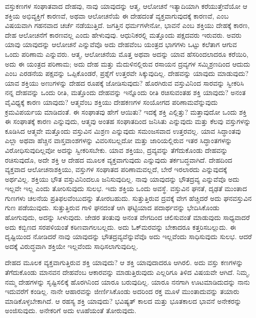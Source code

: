 \vskip 2pt

ವಸ್ತುಕಣಗಳ ಸಂಘಾತವಾದ ದೇಹವು, ನಾವು ಯಾವುದನ್ನು ಆತ್ಮ, ಆಲೋಚನೆ ಇತ್ಯಾದಿಯಾಗಿ ಕರೆಯುತ್ತೇವೆಯೋ ಆ ಶಕ್ತಿಯ ಅಭಿವ್ಯಕ್ತಿಗೆ ಕಾರಣವೆ, ಅಥವಾ ಆಲೋಚನೆಯೆ ಈ ದೇಹದಂತೆ ವ್ಯಕ್ತವಾಗುವುದಕ್ಕೆ ಕಾರಣವೆ, ಎಂಬ ವಿಷಯವಾಗಿ ಗಹನವಾದ ಚರ್ಚೆ ನಡೆಯುತ್ತಿದೆ. ಜಗತ್ತಿನ ಧರ್ಮಗಳೇನೋ, ಭಾವನೆ ಎಂಬ ಶಕ್ತಿಯು ದೇಹಕ್ಕೆ ಕಾರಣ, ದೇಹ ಆಲೋಚನೆಗೆ ಕಾರಣವಲ್ಲ ಎಂದು ಹೇಳುವುವು. ಆಧುನಿಕರಲ್ಲಿ ಮತ್ತೊಂದು ಪಕ್ಷದವರು ಇರುವರು. ಅವರು ಯಾವು ಯಾವುದನ್ನು ಆಲೋಚನೆ ಎನ್ನುವೆವೊ ಅದು ದೇಹವೆಂಬ ಯಂತ್ರದ ಭಾಗಗಳು ಒಟ್ಟು ಕಲೆತಾಗ ಆಗುವ ಒಂದು ಪರಿಣಾಮ ಎನ್ನುವರು. ಆತ್ಮ, ಆಲೋಚನೆಯ ಮೊತ್ತ ಅಥವಾ ಅದನ್ನು ಯಾವ ಹೆಸರಿಂದಲಾದರೂ ಕರೆಯಿರಿ, ಅದು ಈ ಯಂತ್ರದ ಪರಿಣಾಮ; ಅದು ದೇಹ ಮತ್ತು ಮೆದುಳಿನಲ್ಲಿರುವ ರಸಾಯನ ದ್ರವ್ಯಗಳ ಸಮ್ಮಿಶ್ರಣದಿಂದ ಆದುದು ಎಂಬ ಎರಡನೆಯ ಪಕ್ಷವನ್ನು ಒಪ್ಪಿಕೊಂಡರೆ, ಪ್ರಶ್ನೆಗೆ ಉತ್ತರವೇ ಸಿಕ್ಕುವುದಿಲ್ಲ. ದೇಹವನ್ನು ಯಾವುದು ಮಾಡುವುದು? ಯಾವ ಶಕ್ತಿಯು ಅಣುಗಳನ್ನು ದೇಹದ ರೂಪಕ್ಕೆ ಜೋಡಿಸುವುದು? ಹೊರಗಿರುವ ವಸ್ತುವಿನಿಂದ ಸಾರವನ್ನು ಸ್ವೀಕರಿಸಿ ನನ್ನ ದೇಹವನ್ನು ಒಂದು ರೀತಿ, ಮತ್ತೊಂದು ದೇಹವನ್ನು ಇನ್ನೊಂದು ರೀತಿ ರಚಿಸುವಂತಹ ಶಕ್ತಿ ಯಾವುದು? ಅನಂತ ವೈವಿಧ್ಯಕ್ಕೆ ಕಾರಣ ಯಾವುದು? ಆತ್ಮವೆಂಬ ಶಕ್ತಿಯು ದೇಹಕಣಗಳ ಸಂಯೋಗದ ಪರಿಣಾಮವೆನ್ನುವುದು ಕ್ರಮವಿಪರ್ಯಯ ಮಾಡಿದಂತೆ. ಈ ಸಂಘಾತವು ಹೇಗೆ ಆಯಿತು? ಇದಕ್ಕೆ ಶಕ್ತಿ ಎಲ್ಲಿತ್ತು? ಮತ್ತಾವುದೋ ಒಂದು ಶಕ್ತಿ ಈ ಸಂಘಾತಕ್ಕೆ ಕಾರಣ ಎನ್ನುವುದು, ಆತ್ಮವು ಅಂತಹ ಸಂಘಾತದಿಂದ ಜನಿಸಿತು ಎನ್ನುವುದು ಮತ್ತು ಕೆಲವು ವಸ್ತುಗಳನ್ನು ಕೂಡಿಸಿದ ಆತ್ಮವೇ ಮತ್ತೊಂದು ವಸ್ತುವಿನ ಮಿಶ್ರಣ ಎನ್ನುವುದು ಸಮಂಜಸವಾದ ಉತ್ತರವಲ್ಲ. ಯಾವ ಸಿದ್ಧಾಂತವು ಎಲ್ಲಾ ಅಥವಾ ಹೆಚ್ಚಿನ ವಾಸ್ತವಾಂಶಗಳನ್ನು ವಿವರಿಸಬಲ್ಲದೋ ಮತ್ತು ಜಾರಿಯಲ್ಲಿರುವ ಇತರ ಸಿದ್ಧಾಂತಗಳನ್ನು ವಿರೋಧಿಸುವುದಿಲ್ಲವೋ ಅದನ್ನು ಸ್ವೀಕರಿಸಬೇಕು. ಯಾವ ಶಕ್ತಿಯು, ದ್ರವ್ಯವನ್ನು ತೆಗೆದುಕೊಂಡು ದೇಹವನ್ನು ರಚಿಸುವುದೊ, ಅದೇ ಶಕ್ತಿ ಆ ದೇಹದ ಮೂಲಕ ವ್ಯಕ್ತವಾಗುವುದು ಎನ್ನುವುದು ತರ್ಕಬದ್ಧವಾಗಿದೆ. ದೇಹದಿಂದ ವ್ಯಕ್ತವಾದ ಆಲೋಚನಾಶಕ್ತಿಯು, ವಸ್ತುಗಳ ಸಂಘಾತದ ಪರಿಣಾಮವಲ್ಲದೆ, ಬೇರೆ ಇರಲಾರದು ಎನ್ನುವುದಕ್ಕೆ ಅರ್ಥವಿಲ್ಲ. ಶಕ್ತಿಯು ಭೌತ ವಸ್ತುವಿನಿಂದಲೂ ಜನಿಸುವುದಿಲ್ಲ. ನಾವು ಯಾವುದನ್ನು ಭೌತದ್ರವ್ಯ ಎನ್ನುವೆವೊ ಅದು ಇಲ್ಲವೇ ಇಲ್ಲ ಎಂದು ತೋರಿಸುವುದು ಸುಲಭ. ಇದು ಶಕ್ತಿಯ ಒಂದು ಅವಸ್ಥೆ. ವಸ್ತುವಿನ ಘನತೆ, ದೃಢತೆ ಮುಂತಾದ ಗುಣಗಳು ಚಲನೆಯ ಪ್ರತಿಫಲವೆಂಬುದನ್ನು ತೋರಬಹುದು. ಸುತ್ತುತ್ತಿರುವ ದ್ರವಕ್ಕೆ ವೇಗ ಹೆಚ್ಚಿದರೆ ಅದು ಘನವಸ್ತುವಿನ ಗುಣ ಪಡೆಯುವುದು. ಸುತ್ತುತ್ತಿರುವ ಗಾಳಿ ಘನದಂತೆ ಆಗಿ ಘಟ್ಟಿಯಾದ ಪದಾರ್ಥವನ್ನು ಭೇದಿಸಿಕೊಂಡು ಹೋಗುವುದು, ಅದನ್ನು ಸೀಳುವುದು. ಜೇಡರ ತಂತುವು ಅನಂತ ವೇಗದಿಂದ ಚಲಿಸುವಂತೆ ಮಾಡುವುದು ಸಾಧ್ಯವಾದರೆ ಅದು ಕಬ್ಬಿಣದ ಸರಪಳಿಯಂತೆ ಕಠಿಣವಾಗಲಬಲ್ಲದು. ಅದು ಓಕ್​ ಮರವನ್ನು ಬೇಕಾದರೂ ಕತ್ತರಿಸಬಲ್ಲುದು. ಈ ದೃಷ್ಟಿಯಿಂದ ನೋಡಿದರೆ ನಾವು ಯಾವುದನ್ನು ಭೌತದ್ರವ್ಯವೆನ್ನುವೆವೊ ಅದು ಇಲ್ಲವೆಂದು ಸಾಧಿಸುವುದು ಸುಲಭ. ಆದರೆ ಅದಕ್ಕೆ ವಿರುದ್ಧವಾಗಿ ಶಕ್ತಿಯೇ ಇಲ್ಲವೆಂದು ಸಾಧಿಸಲಾಗುವುದಿಲ್ಲ.

\vskip 2pt

ದೇಹದ ಮೂಲಕ ವ್ಯಕ್ತವಾಗುತ್ತಿರುವ ಶಕ್ತಿ ಯಾವುದು? ಆ ಶಕ್ತಿ ಯಾವುದಾದರೂ ಆಗಿರಲಿ. ಅದು ವಸ್ತು ಕಣಗಳನ್ನು ತೆಗೆದುಕೊಂಡು ಮಾನವನ ದೇಹವೆಂಬ ಆಕಾರವನ್ನು ಮಾಡುತ್ತಿರುವುದು ಎಲ್ಲರಿಗೂ ತಿಳಿದ ವಿಷಯವೇ ಆಗಿದೆ. ನಿಮ್ಮ, ನಮ್ಮ ದೇಹಗಳನ್ನು ಸೃಷ್ಟಿಸಲಿಕ್ಕೆ ಹೊರಗಿನಿಂದ ಯಾರೂ ಬರುವುದಿಲ್ಲ. ಯಾರೂ ನನಗಾಗಿ ಊಟಮಾಡಿದುದನ್ನು ನಾನು ಇದುವರೆಗೆ ಕಂಡಿಲ್ಲ. ನಾನೇ ಆಹಾರವನ್ನು ಜೀರ್ಣಿಸಿಕೊಂಡು ಅದರಿಂದ ರಕ್ತ ಮೂಳೆ ಮುಂತಾದುವನ್ನು ತಯಾರು ಮಾಡಿಕೊಳ್ಳಬೇಕಾಗಿದೆ. ಆ ರಹಸ್ಯ ಶಕ್ತಿ ಯಾವುದು? ಭವಿಷ್ಯತ್​ ಕಾಲದ ಮತ್ತು ಭೂತಕಾಲದ ಭಾವನೆ ಅನೇಕರನ್ನು ಅಂಜಿಸುವುದು. ಅನೇಕರಿಗೆ ಅದು ಊಹೆಯಂತೆ ತೋರುವುದು.


